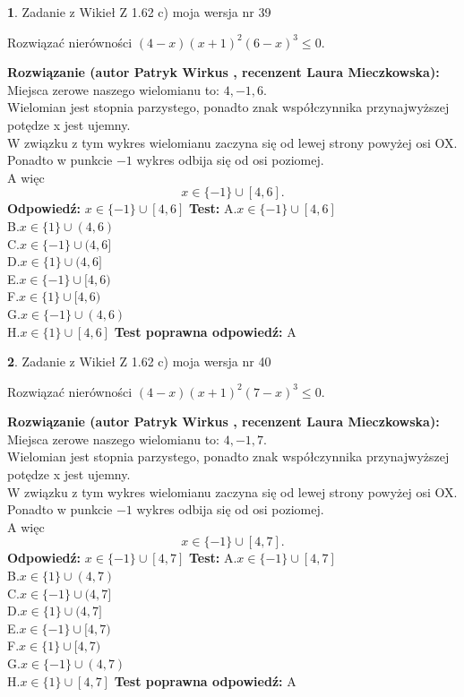 \documentclass[12pt, a4paper]{article}
\theoremstyle{definition} %
\newtheorem{zad}{}
\newcommand{\zadStart}[1]{\begin{zad}#1\newline}
\newcommand{\zadStop}{\end{zad}}
\newcommand{\rozwStart}[2]{\noindent \textbf{Rozwiązanie (autor #1 , recenzent #2): }\newline}
\newcommand{\rozwStop}{\newline}
\newcommand{\odpStart}{\noindent \textbf{Odpowiedź:}\newline}
\newcommand{\odpStop}{\newline}
\newcommand{\testStart}{\noindent \textbf{Test:}\newline}
\newcommand{\testStop}{\newline}
\newcommand{\kluczStart}{\noindent \textbf{Test poprawna odpowiedź:}\newline}
\newcommand{\kluczStop}{\newline}
\begin{document}
\zadStart{Zadanie z Wikieł Z 1.62 c) moja wersja nr 39}

Rozwiązać nierówności $(4-x)(x+1)^{2}(6-x)^{3}\le0$.
\zadStop
\rozwStart{Patryk Wirkus}{Laura Mieczkowska}
Miejsca zerowe naszego wielomianu to: $4, -1, 6$.\\
Wielomian jest stopnia parzystego, ponadto znak współczynnika przy\linebreak najwyższej potędze x jest ujemny.\\ W związku z tym wykres wielomianu zaczyna się od lewej strony powyżej osi OX.\\
Ponadto w punkcie $-1$ wykres odbija się od osi poziomej.\\
A więc $$x \in \{-1\} \cup [4,6].$$
\rozwStop
\odpStart
$x \in \{-1\} \cup [4,6]$
\odpStop
\testStart
A.$x \in \{-1\} \cup [4,6]$\\
B.$x \in \{1\} \cup (4,6)$\\
C.$x \in \{-1\} \cup (4,6]$\\
D.$x \in \{1\} \cup (4,6]$\\
E.$x \in \{-1\} \cup [4,6)$\\
F.$x \in \{1\} \cup [4,6)$\\
G.$x \in \{-1\} \cup (4,6)$\\
H.$x \in \{1\} \cup [4,6]$
\testStop
\kluczStart
A
\kluczStop



\zadStart{Zadanie z Wikieł Z 1.62 c) moja wersja nr 40}

Rozwiązać nierówności $(4-x)(x+1)^{2}(7-x)^{3}\le0$.
\zadStop
\rozwStart{Patryk Wirkus}{Laura Mieczkowska}
Miejsca zerowe naszego wielomianu to: $4, -1, 7$.\\
Wielomian jest stopnia parzystego, ponadto znak współczynnika przy\linebreak najwyższej potędze x jest ujemny.\\ W związku z tym wykres wielomianu zaczyna się od lewej strony powyżej osi OX.\\
Ponadto w punkcie $-1$ wykres odbija się od osi poziomej.\\
A więc $$x \in \{-1\} \cup [4,7].$$
\rozwStop
\odpStart
$x \in \{-1\} \cup [4,7]$
\odpStop
\testStart
A.$x \in \{-1\} \cup [4,7]$\\
B.$x \in \{1\} \cup (4,7)$\\
C.$x \in \{-1\} \cup (4,7]$\\
D.$x \in \{1\} \cup (4,7]$\\
E.$x \in \{-1\} \cup [4,7)$\\
F.$x \in \{1\} \cup [4,7)$\\
G.$x \in \{-1\} \cup (4,7)$\\
H.$x \in \{1\} \cup [4,7]$
\testStop
\kluczStart
A
\kluczStop
\end{document}
